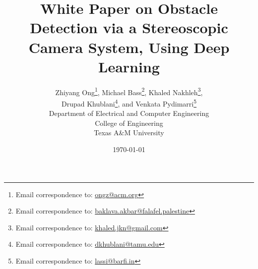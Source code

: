 \documentclass[letter,12pt]{article}
\begin{document}
\title{White Paper on Obstacle Detection via a Stereoscopic Camera System, Using Deep Learning}
\date{\today}
\author{Zhiyang Ong\thanks{Email correspondence to: \href{mailto:ongz@acm.org}{ongz@acm.org}}, Michael Bass\thanks{Email correspondence to: \href{mailto:baklava.akbar@falafel.palestine}{baklava.akbar@falafel.palestine}}, Khaled Nakhleh\thanks{Email correspondence to: \href{mailto:khaled.jkn@gmail.com}{khaled.jkn@gmail.com}}, \\
Drupad Khublani\thanks{Email correspondence to: \href{mailto:dkhublani@tamu.edu}{dkhublani@tamu.edu}}, and Venkata Pydimarri\thanks{Email correspondence to: \href{mailto:lassi@barfi.in}{lassi@barfi.in}} \\
Department of Electrical and Computer Engineering \\
College of Engineering \\
Texas A\&M University
}
\maketitle







%
%
\end{document}
